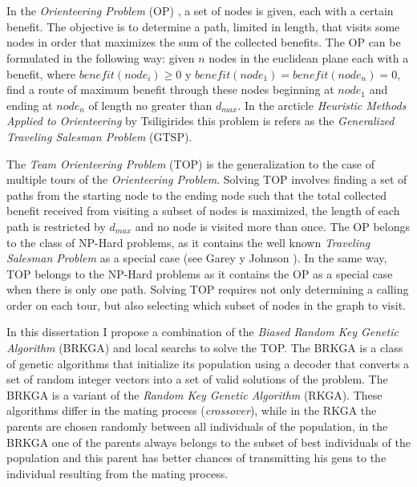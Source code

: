 
\chapter*{\tituloAbstractEn}

\noindent In the \textit{Orienteering Problem} (OP) \cite{Tsiligirides}, a set of nodes is given, each with a certain benefit. The objective is to determine a path, limited in length, that visits some nodes in order that maximizes the sum of the collected benefits. The OP can be formulated in the following way: given $n$ nodes in the euclidean plane each with a benefit, where $benefit(node_i) \geq 0$ y $benefit(node_1) = benefit(node_n) = 0$, find a route of maximum benefit through these nodes beginning at $node_1$ and ending at $node_n$ of length no greater than $d_{max}$. In the  arcticle \textit{Heuristic Methods Applied to Orienteering} by Tsiligirides \cite{Tsiligirides} this problem is refers as the \textit{Generalized Traveling Salesman Problem} (GTSP).

\bigskip

The \textit{Team Orienteering Problem} (TOP) \cite{ChaoGoldenWasil} is the generalization to the case of multiple tours of the \textit{Orienteering Problem}. Solving TOP involves finding a set of paths from the starting node to the ending node such that the total collected benefit received from visiting a subset of nodes is maximized, the length of each path is restricted by $d_{max}$ and no node is visited more than once. The OP belongs to the class of NP-Hard problems, as it contains the well known \textit{Traveling Salesman Problem} as a special case (see Garey y Johnson \cite{GareyJohnson}). In the same way, TOP belongs to the NP-Hard problems as it contains the OP as a special case when there is only one path. Solving TOP requires not only determining a calling order on each tour, but also selecting which subset of nodes in the graph to visit.

\bigskip

In this dissertation I propose a combination of the \textit{Biased Random Key Genetic Algorithm} (BRKGA) \cite{Bean} and local searchs to solve the TOP. The BRKGA is a class of genetic algorithms that initialize its population using a decoder that converts a set of random integer vectors into a set of valid solutions of the problem. The BRKGA is a variant of the \textit{Random Key Genetic Algorithm} (RKGA). These algorithms differ in the mating process (\textit{crossover}), while in the RKGA the parents are chosen randomly between all individuals of the population, in the BRKGA one of the parents always belongs to the subset of best individuals of the population and this parent has better chances of transmitting his gens to the individual resulting from the mating process.

